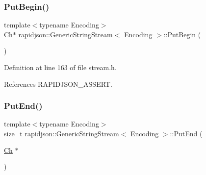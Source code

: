 \subsubsection{\texorpdfstring{PutBegin()}{PutBegin()}}
{\footnotesize\ttfamily template$<$typename Encoding$>$ \\
\mbox{\hyperlink{structrapidjson_1_1_generic_string_stream_a70ad06c96ddf8349be59f3d4f6bbadc8}{Ch}}$\ast$ \mbox{\hyperlink{structrapidjson_1_1_generic_string_stream}{rapidjson\+::\+Generic\+String\+Stream}}$<$ \mbox{\hyperlink{classrapidjson_1_1_encoding}{Encoding}} $>$\+::Put\+Begin (\begin{DoxyParamCaption}{ }\end{DoxyParamCaption})}



Definition at line 163 of file stream.\+h.


\begin{DoxyCode}{0}

\end{DoxyCode}


References R\+A\+P\+I\+D\+J\+S\+O\+N\+\_\+\+A\+S\+S\+E\+RT.

\mbox{\label{structrapidjson_1_1_generic_string_stream_a105adc6eec3483f90f6f2cf57aa81c12}} 
\subsubsection{\texorpdfstring{PutEnd()}{PutEnd()}}
{\footnotesize\ttfamily template$<$typename Encoding$>$ \\
size\+\_\+t \mbox{\hyperlink{structrapidjson_1_1_generic_string_stream}{rapidjson\+::\+Generic\+String\+Stream}}$<$ \mbox{\hyperlink{classrapidjson_1_1_encoding}{Encoding}} $>$\+::Put\+End (\begin{DoxyParamCaption}\item[{\mbox{\hyperlink{structrapidjson_1_1_generic_string_stream_a70ad06c96ddf8349be59f3d4f6bbadc8}{Ch}} $\ast$}]{ }\end{DoxyParamCaption})}



